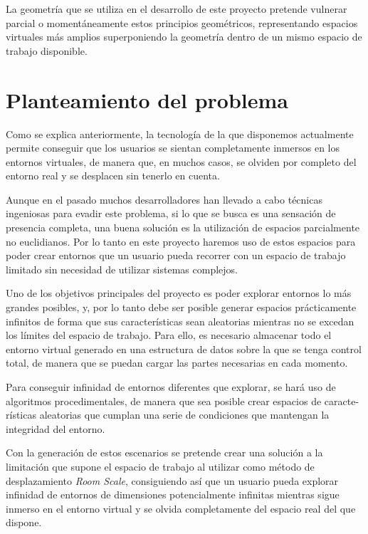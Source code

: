 \documentclass[../main.tex]{subfiles}
\begin{document}
La geometría que se utiliza en el desarrollo de este proyecto pretende vulnerar parcial o momentáneamente estos principios geométricos, representando espacios virtuales más amplios superponiendo la geometría dentro de un mismo espacio de trabajo disponible.

\section{Planteamiento del problema}

Como se explica anteriormente, la tecnología de la que disponemos actualmente permite conseguir que los usuarios se sientan completamente inmersos en los entornos virtuales, de manera que, en muchos casos, se olviden por completo del entorno real y se desplacen sin tenerlo en cuenta.

Aunque en el pasado muchos desarrolladores han llevado a cabo técnicas ingeniosas para evadir este problema, si lo que se busca es una sensación de presencia completa, una buena solución es la utilización de espacios parcialmente no euclidianos. Por lo tanto en este proyecto haremos uso de estos espacios para poder crear entornos que un usuario pueda recorrer con un espacio de trabajo limitado sin necesidad de utilizar sistemas complejos.

Uno de los objetivos principales del proyecto es poder explorar entornos lo más grandes posibles, y, por lo tanto debe ser posible generar espacios prácticamente infinitos de forma que sus características sean aleatorias mientras no se excedan los límites del espacio de trabajo. Para ello, es necesario almacenar todo el entorno virtual generado en una estructura de datos sobre la que se tenga control total, de manera que se puedan cargar las partes necesarias en cada momento.

Para conseguir infinidad de entornos diferentes que explorar, se hará uso de algoritmos procedimentales, de manera que sea posible crear espacios de caracte- rísticas aleatorias que cumplan una serie de condiciones que mantengan la integridad del entorno.

Con la generación de estos escenarios se pretende crear una solución a la limitación que supone el espacio de trabajo al utilizar como método de desplazamiento \textit{Room Scale}, consiguiendo así que un usuario pueda explorar infinidad de entornos de dimensiones potencialmente infinitas mientras sigue inmerso en el entorno virtual y se olvida completamente del espacio real del que dispone.
\end{document}
